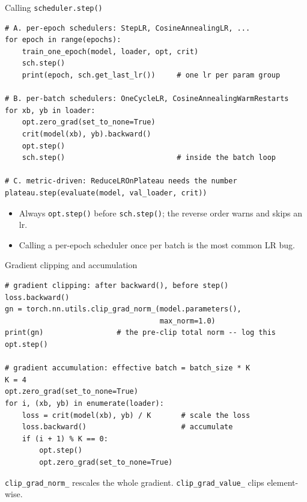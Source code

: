 \documentclass[10pt,aspectratio=169]{beamer}
\begin{document}
\begin{frame}[fragile]{Calling \texttt{scheduler.step()}}
\begin{lstlisting}
# A. per-epoch schedulers: StepLR, CosineAnnealingLR, ...
for epoch in range(epochs):
    train_one_epoch(model, loader, opt, crit)
    sch.step()
    print(epoch, sch.get_last_lr())     # one lr per param group

# B. per-batch schedulers: OneCycleLR, CosineAnnealingWarmRestarts
for xb, yb in loader:
    opt.zero_grad(set_to_none=True)
    crit(model(xb), yb).backward()
    opt.step()
    sch.step()                          # inside the batch loop

# C. metric-driven: ReduceLROnPlateau needs the number
plateau.step(evaluate(model, val_loader, crit))
\end{lstlisting}
\begin{itemize}
    \item Always \texttt{opt.step()} before \texttt{sch.step()}; the reverse order warns and skips an lr.
    \item Calling a per-epoch scheduler once per batch is the most common LR bug.
\end{itemize}
\end{frame}

\begin{frame}[fragile]{Gradient clipping and accumulation}
\begin{lstlisting}
# gradient clipping: after backward(), before step()
loss.backward()
gn = torch.nn.utils.clip_grad_norm_(model.parameters(),
                                    max_norm=1.0)
print(gn)                 # the pre-clip total norm -- log this
opt.step()

# gradient accumulation: effective batch = batch_size * K
K = 4
opt.zero_grad(set_to_none=True)
for i, (xb, yb) in enumerate(loader):
    loss = crit(model(xb), yb) / K       # scale the loss
    loss.backward()                      # accumulate
    if (i + 1) % K == 0:
        opt.step()
        opt.zero_grad(set_to_none=True)
\end{lstlisting}
\texttt{clip\_grad\_norm\_} rescales the whole gradient.
\texttt{clip\_grad\_value\_} clips element-wise.
\end{frame}
\end{document}

